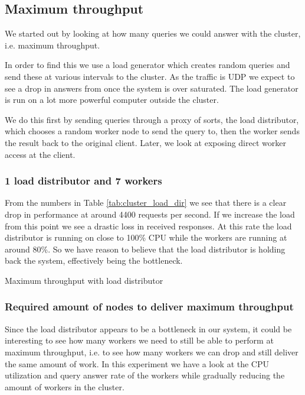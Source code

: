 \subsection{Maximum throughput}
We started out by looking at how many queries we could answer with the cluster, i.e. maximum throughput.

In order to find this we use a load generator which creates random queries and send these at various intervals to the cluster. As the traffic is UDP we expect to see a drop in answers from once the system is over saturated. The load generator is run on a lot more powerful computer outside the cluster.

We do this first by sending queries through a proxy of sorts, the load distributor, which chooses a random worker node to send the query to, then the worker sends the result back to the original client.
Later, we look at exposing direct worker access at the client.

\subsubsection{1 load distributor and 7 workers}
From the numbers in Table \ref{tab:cluster_load_dir} we see that there is a clear drop in performance at around 4400 requests per second. If we increase the load from this point we see a drastic loss in received responses. At this rate the load distributor is running on close to 100\% CPU while the workers are running at around 80\%. So we have reason to believe that the load distributor is holding back the system, effectively being the bottleneck.

\clusterloaddir
\begin{table}[h]
	\centering
	\pgfplotstabletypeset[
     	columns={requests, received},
     	every head row/.style={before row=\hline,
     	after row=\hline},
		every last row/.style={after row=\hline},
		columns/requests/.style={column name=Requests per second},
		columns/received/.style={column name=\% queries served},
     	]
    {\clusterloaddir}
	\caption{Maximum throughput with load distributor}
	\label{tab:cluster_load_dir}
\end{table}

\subsubsection{Required amount of nodes to deliver maximum throughput}
Since the load distributor appears to be a bottleneck in our system, it could be interesting to see how many workers we need to still be able to perform at maximum throughput, i.e. to see how many workers we can drop and still deliver the same amount of work.
In this experiment we have a look at the CPU utilization and query answer rate of the workers while gradually reducing the amount of workers in the cluster.

